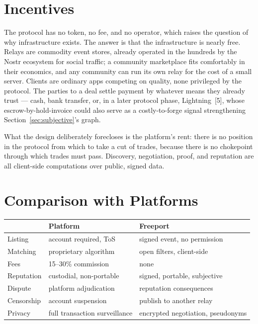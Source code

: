 \documentclass[11pt]{article}
\begin{document}
\section{Incentives}

The protocol has no token, no fee, and no operator, which raises the
question of why infrastructure exists. The answer is that the infrastructure
is nearly free. Relays are commodity event stores, already operated in the
hundreds by the Nostr ecosystem for social traffic; a community marketplace
fits comfortably in their economics, and any community can run its own relay
for the cost of a small server. Clients are ordinary apps competing on
quality, none privileged by the protocol. The parties to a deal settle
payment by whatever means they already trust --- cash, bank transfer, or, in
a later protocol phase, Lightning~[5], whose escrow-by-hold-invoice could
also serve as a costly-to-forge signal strengthening
Section~\ref{sec:subjective}'s graph.

What the design deliberately forecloses is the platform's rent: there is no
position in the protocol from which to take a cut of trades, because there
is no chokepoint through which trades must pass. Discovery, negotiation,
proof, and reputation are all client-side computations over public, signed
data.

\section{Comparison with Platforms}

\begin{center}
\begin{tabular}{lll}
\toprule
 & \textbf{Platform} & \textbf{Freeport} \\
\midrule
Listing    & account required, ToS      & signed event, no permission \\
Matching   & proprietary algorithm      & open filters, client-side \\
Fees       & 15--30\% commission        & none \\
Reputation & custodial, non-portable    & signed, portable, subjective \\
Dispute    & platform adjudication      & reputation consequences \\
Censorship & account suspension         & publish to another relay \\
Privacy    & full transaction surveillance & encrypted negotiation, pseudonyms \\
\bottomrule
\end{tabular}
\end{center}
\end{document}
